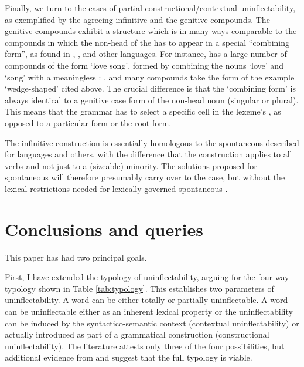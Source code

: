 \documentclass[output=paper,colorlinks,citecolor=brown]{langscibook}
\begin{document}
{	Finally, we turn to the cases of partial constructional/contextual uninflectability, as exemplified by the  agreeing infinitive and the  genitive compounds. The  genitive compounds exhibit a structure which is in many ways comparable to the compounds  in which the non-head of the  has to appear in a special ``combining form'', as found in , ,  and other languages. For instance,  has a large number of compounds of the form  `love song', formed by combining the nouns  `love' and  `song' with a meaningless  :  \citep{nublingszczepaniak2013}, and many  compounds take the form of the example   `wedge-shaped' cited  above. The crucial difference is that the  `combining form' is always identical to a genitive case form of the non-head noun (singular or plural). This means that the grammar has to select a specific cell in the lexeme's , as opposed to a particular  form or the root form.
	
	The  infinitive construction is essentially homologous to the spontaneous  described for  languages and others, with the difference that the construction applies to all verbs and not just to a (sizeable) minority. The solutions proposed for spontaneous  will therefore presumably carry over to the  case, but without the lexical restrictions needed for lexically-governed spontaneous .
}

\section{Conclusions and queries}
	
This paper has had two principal goals. 

First, I have extended the typology of uninflectability, arguing for the four-way typology shown in Table \ref{tab:typology}. This establishes two parameters of uninflectability. A word can be either totally or partially uninflectable. A word can be uninflectable either as an inherent lexical property or the uninflectability can be induced by the syntactico-semantic context (contextual uninflectability) or  actually introduced as part of a grammatical construction (constructional uninflectability). The literature attests only three of the four possibilities, but additional evidence from  and  suggest that the full typology is viable. 
\end{document}
